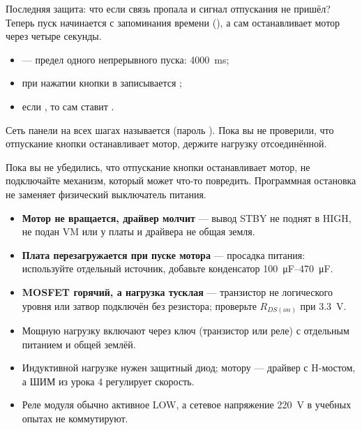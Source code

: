 Последняя защита: что если связь пропала и сигнал отпускания не пришёл? Теперь пуск начинается с запоминания
времени (), а  сам останавливает мотор через четыре секунды.


\begin{itemize}[leftmargin=*]
  \item {} --- предел одного непрерывного пуска: \SI{4000}{ms};
  \item при нажатии кнопки в  записывается ;
  \item если , то  сам ставит .
\end{itemize}

Сеть панели на всех шагах называется  (пароль ). Пока вы не проверили,
что отпускание кнопки останавливает мотор, держите нагрузку отсоединённой.

\begin{caution}
Пока вы не убедились, что отпускание кнопки останавливает мотор, не подключайте механизм, который
может что-то повредить. Программная остановка не заменяет физический выключатель питания.
\end{caution}

\begin{trouble}
\begin{itemize}[leftmargin=*]
  \item \textbf{Мотор не вращается, драйвер молчит} --- вывод STBY не поднят в HIGH, не подан VM или у платы и драйвера не общая земля.
  \item \textbf{Плата перезагружается при пуске мотора} --- просадка питания: используйте отдельный источник, добавьте конденсатор \SIrange{100}{470}{\micro F}.
  \item \textbf{MOSFET горячий, а нагрузка тусклая} --- транзистор не логического уровня или затвор подключён без резистора; проверьте $R_{DS(on)}$ при \SI{3.3}{V}.
\end{itemize}
\end{trouble}

\begin{summary}
\begin{itemize}[leftmargin=*]
  \item Мощную нагрузку включают через ключ (транзистор или реле) с отдельным питанием и общей землёй.
  \item Индуктивной нагрузке нужен защитный диод; мотору --- драйвер с H-мостом, а ШИМ из урока 4 регулирует скорость.
  \item Реле модуля обычно активное LOW, а сетевое напряжение \SI{220}{V} в учебных опытах не коммутируют.
\end{itemize}
\end{summary}

